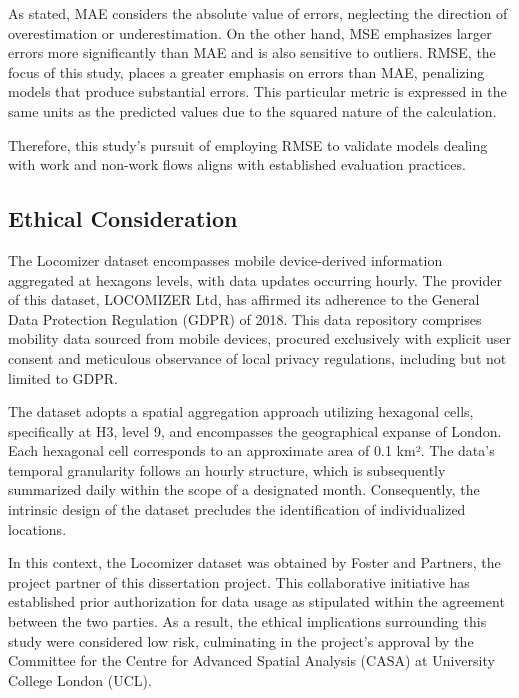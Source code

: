 As \cite{lucaSurveyDeepLearning2021} stated, MAE considers the absolute value of errors, neglecting the direction of overestimation or underestimation. On the other hand, MSE emphasizes larger errors more significantly than MAE and is also sensitive to outliers. RMSE, the focus of this study, places a greater emphasis on errors than MAE, penalizing models that produce substantial errors. This particular metric is expressed in the same units as the predicted values due to the squared nature of the calculation.

Therefore, this study's pursuit of employing RMSE to validate models dealing with work and non-work flows aligns with established evaluation practices. 

\subsection{Ethical Consideration}

The Locomizer dataset encompasses mobile device-derived information aggregated at hexagons levels, with data updates occurring hourly. The provider of this dataset, LOCOMIZER Ltd, has affirmed its adherence to the General Data Protection Regulation (GDPR) of 2018. This data repository comprises mobility data sourced from mobile devices, procured exclusively with explicit user consent and meticulous observance of local privacy regulations, including but not limited to GDPR.

The dataset adopts a spatial aggregation approach utilizing hexagonal cells, specifically at H3, level 9, and encompasses the geographical expanse of London. Each hexagonal cell corresponds to an approximate area of 0.1 km². The data's temporal granularity follows an hourly structure, which is subsequently summarized daily within the scope of a designated month. Consequently, the intrinsic design of the dataset precludes the identification of individualized locations.

In this context, the Locomizer dataset was obtained by Foster and Partners, the project partner of this dissertation project. This collaborative initiative has established prior authorization for data usage as stipulated within the agreement between the two parties. As a result, the ethical implications surrounding this study were considered low risk, culminating in the project's approval by the Committee for the Centre for Advanced Spatial Analysis (CASA) at University College London (UCL).